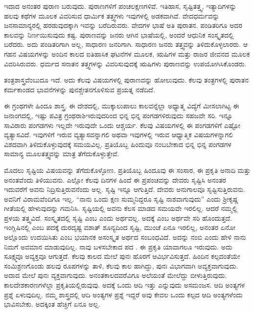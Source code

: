 ಇದಾದ ಅನಂತರ ಪುರಾಣ ಬರುವುದು. ಪುರಾಣಗಳಿಗೆ ಪಂಚಲಕ್ಷಣಗಳಿವೆ. ಇತಿಹಾಸ, ಸೃಷ್ಟಿತತ್ತ್ವ, ಇತ್ಯಾದಿಗಳನ್ನು ಹಲವು ಕಥೆಗಳ ಮೂಲಕ ವಿವರಿಸುವ ಧಾರ್ಮಿಕ ತತ್ತ್ವಗಳು ಇವುಗಳಲ್ಲಿ ಅಡಕವಾಗಿವೆ. ವೇದಧರ್ಮವನ್ನು ಜನಸಾಮಾನ್ಯರಲ್ಲಿ ಹರಡುವುದಕ್ಕಾಗಿ ಇವನ್ನು ಬರೆದಿರುವರು. ವೇದಗಳ ಭಾಷೆ ಅತಿ ಪುರಾತನ. ಪಂಡಿತರಿಗೂ ಅದರ ಕಾಲವನ್ನು ನಿರ್ಣಯಿಸುವುದು ಕಷ್ಟ. ಪುರಾಣವನ್ನು ಜನರು ಆಗಿನ ಭಾಷೆಯಲ್ಲಿ, ಅಂದರೆ ಆಧುನಿಕ ಸಂಸ್ಕೃತದಲ್ಲಿ ಬರೆದರು. ಅದು ಪಂಡಿತರಿಗಾಗಿ ಅಲ್ಲ, ಸಾಧಾರಣ ಜನರಿಗಾಗಿ. ಸಾಧಾರಣ ಜನರು ತತ್ತ್ವವನ್ನು ತಿಳಿದುಕೊಳ್ಳಲಾರರು. ಆ ಗಹನ ವಿಷಯಗಳನ್ನು ಅಂದಿನ ಕಾಲದ ಐತಿಹಾಸಿಕ ಘಟನೆಗಳ ಮೂಲಕ, ಋಷಿಗಳ ಮತ್ತು ರಾಜರ ಜೀವನದ ಮೂಲಕ ವಿವರಿಸಿರುವರು. ಧರ್ಮದ ಸನಾತನ ತತ್ತ್ವಗಳನ್ನು ವಿವರಿಸುವುದಕ್ಕೆ ಋಷಿಗಳು ಪುರಾಣವನ್ನು ಉಪಯೋಗಿಸಿಕೊಂಡರು.

ತಂತ್ರಶಾಸ್ತ್ರವೆಂಬುದೂ ಇದೆ. ಅದು ಕೆಲವು ವಿಷಯಗಳಲ್ಲಿ ಪುರಾಣವನ್ನು ಹೋಲುವುದು. ಕೆಲವು ತಂತ್ರಗಳಲ್ಲಿ ಪುರಾತನ ಕರ್ಮಕಾಂಡದ ಭಾವನೆಗಳನ್ನು ಪುನಶ್ಚೇತನಗೊಳಿಸುವ ಪ್ರಯತ್ನ ನಡೆದಿದೆ.

ಈ ಗ್ರಂಥಗಳೇ ಹಿಂದೂ ಶಾಸ್ತ್ರ. ಈ ದೇಶದಲ್ಲಿ, ಮುಕ್ಕಾಲುಪಾಲು ಕಾಲ\break ವನ್ನೆಲ್ಲಾ ಅಧ್ಯಾತ್ಮ ವಿದ್ಯೆಗೆ ಮೀಸಲಾಗಿಟ್ಟ ಈ ಜನಾಂಗದಲ್ಲಿ, ಇಷ್ಟು ಪವಿತ್ರ ಗ್ರಂಥರಾಶಿ\break ಇರುವುದರಿಂದ ಭಿನ್ನ ಭಿನ್ನ ಪಂಗಡಗಳಿರುವುದು ಸಹಜವೇ ಸರಿ. ಇನ್ನೂ ಸಾವಿರಾರು ಪಂಗಡಗಳು ಇಲ್ಲದೇ ಇರುವುದೇ ಒಂದು ಆಶ್ಚರ್ಯ. ಕೆಲವು ವಿಷಯಗಳಲ್ಲಿ ಈ ಪಂಗಡಗಳಿಗೆ ಎಷ್ಟೋ ವ್ಯತ್ಯಾಸವಿದೆ. ಇವುಗಳಿಗೆ ಇರುವ ವ್ಯತ್ಯಾಸವನ್ನಾಗಲಿ ಅಥವಾ ಇವುಗಳಲ್ಲಿ ಇರುವ ಆಧ್ಯಾತ್ಮಿಕ ವಿಷಯಗಳನ್ನಾಗಲಿ ವಿಶದವಾಗಿ ತಿಳಿದುಕೊಳ್ಳುವುದಕ್ಕೆ ಸಮಯವಿಲ್ಲ. ಪ್ರತಿಯೊಬ್ಬ ಹಿಂದುವೂ ನಂಬಬೇಕಾದ ಭಿನ್ನ ಭಿನ್ನ ಪಂಗಡಗಳ ಸಾಮಾನ್ಯ ಮೂಲತತ್ತ್ವವನ್ನು ಮಾತ್ರ ತೆಗೆದುಕೊಳ್ಳುತ್ತೇವೆ.

ಮೊದಲು ಸೃಷ್ಟಿಯ ವಿಷಯವನ್ನು ತೆಗೆದುಕೊಳ್ಳೋಣ. ಪ್ರತಿಯೊಬ್ಬ ಹಿಂದೂವು ಈ ಸಂಸಾರ, ಈ ಪ್ರಕೃತಿ ಅನಾದಿ ಮತ್ತು ಅನಂತವೆಂದು ತಿಳಿಯುವನು. ಎಲ್ಲೋ ಕೆಲವು ದಿನಗಳ ಹಿಂದೆ ಈ ಪ್ರಪಂಚವನ್ನು ದೇವರು ಸೃಷ್ಟಿಸಿ ಅನಂತರ ಇದುವರೆಗೆ ಅವನು ನಿದ್ರಿಸುತ್ತಿರುವನೆಂದು ಅಲ್ಲ. ಸೃಷ್ಟಿ ಇನ್ನೂ ಆಗುತ್ತಿದೆ. ದೇವರು ಅನುಗಾಲವೂ ಸೃಷ್ಟಿಸುತ್ತಿರುವನು. ಅವನಿಗೆ ವಿರಾಮವೆಂದಿಗೂ ಇಲ್ಲ. “ನಾನು ಒಂದು ಕ್ಷಣ ಸುಮ್ಮನಿದ್ದರೂ ಸೃಷ್ಟಿ ನಾಶವಾಗುವುದು” ಎಂದು ಶ‍್ರೀಕೃಷ್ಣ ಗೀತೆಯಲ್ಲಿ ಹೇಳುವುದನ್ನು ಗಮನಿಸಿ. ಸೃಷ್ಟಿಯಲ್ಲಿ ಅವನು ಕೆಲಸ ಮಾಡದ ಸಮಯವೇ ಇರಲಿಲ್ಲ. ಆದರೆ ನಮ್ಮಲ್ಲಿ ಪ್ರಳಯ ತತ್ತ್ವವಿದೆ. ಸಂಸ್ಕೃತದಲ್ಲಿ ಸೃಷ್ಟಿ ಎಂಬ  ಎಂದು ಅರ್ಥವಲ್ಲ. ಅದಕ್ಕೆ  ಎಂಬ ಅರ್ಥವೇ ಸರಿ ಹೊಂದುತ್ತದೆ. ಇಂಗ್ಲಿಷಿನಲ್ಲಿ  ಎಂಬ ಪದಕ್ಕೆ ದುರದೃಷ್ಟ ವಶಾತ್​ ಶೂನ್ಯದಿಂದ ಸೃಷ್ಟಿ, ಮುಂಚೆ ಏನೂ ಇರಲಿಲ್ಲ, ಅನಂತರ ಏನೋ ಅಲ್ಲೊಂದು ಉದಯಿಸಿತು ಎಂಬ ಭಯಾನಕ ಅಸಂಸ್ಕೃತ ಅರ್ಥದ ಸಂಬಂಧವಿದೆ. ಅದನ್ನು ನಂಬಿ ಎಂದು ಹೇಳಿ ನಾನು ನಿಮಗೆ ಅವಮಾನ ಮಾಡುವುದಿಲ್ಲ. ನಾವು ಬಳಸಬೇಕಾದ ಪದ . ಈ ಪ್ರಕೃತಿ ಯಾವಾಗಲೂ ಇರುವುದು. ಅದು ಸೂಕ್ಷ್ಮವೂ ಅವ್ಯಕ್ತವೂ ಆಗುತ್ತದೆ. ಕೆಲವು ಕಾಲದ ಮೇಲೆ ಪುನಃ ಹೊರಗೆ ಆವಿರ್ಭವಿಸುತ್ತದೆ. ಹಿಂದಿನ ಕಲ್ಪದಂತೆಯೇ ಸಂಮಿಶ್ರಣಗೊಂಡು ಹಲವು ರೂಪಗಳನ್ನು ತಾಳಿ, ಕೆಲವು ಕಾಲ ಹಾಗಿದ್ದು, ಪುನಃ ವಿಭಾಗವಾಗಿ ಅವ್ಯಕ್ತವಾಗುವುದು. ಅದಾದ ಮೇಲೆ ಪುನಃ ವ್ಯಕ್ತವಾಗುವುದು. ಅನಂತಕಾಲದವರೆವಿಗೂ ಅಲೆಯಂತೆ ಮೇಲೆದ್ದು ಬೀಳುತ್ತಿರುವುದು. ಕಾಲದೇಶಕಾರಣಗಳೆಲ್ಲಾ ಪ್ರಕೃತಿಯಲ್ಲಿರುವುವು. ಅದಕ್ಕೆ ಒಂದು ಆದಿ ಇತ್ತು ಎನ್ನುವುದು ಅಸಮಂಜಸ. ಆದಿ ಅಂತ್ಯಗಳ ಪ್ರಶ್ನೆ ಏಳುವುದಿಲ್ಲ. ನಮ್ಮ ಶಾಸ್ತ್ರದಲ್ಲಿ ಆದಿ ಅಂತ್ಯಗಳ ಪ್ರಶ್ನೆ ಇದ್ದರೆ ಅವು ಕೇವಲ ಒಂದು ಕಲ್ಪದ ಆದಿ ಅಂತ್ಯಗಳೆಂದು ಭಾವಿಸಬೇಕು. ಅದಕ್ಕಿಂತ ಹೆಚ್ಚಿಗೆ ಏನೂ ಅಲ್ಲ.

